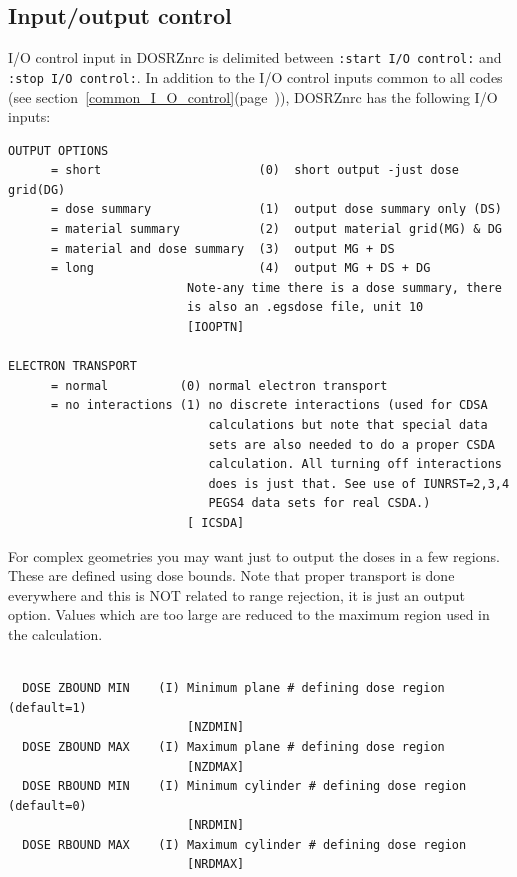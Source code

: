 \documentclass[12pt,twoside]{article}  %
\newcommand{\lpage}[1]{(page~\pageref{#1})}
\begin{document}
\subsection{Input/output control}

I/O control input in DOSRZnrc is delimited between \verb+:start I/O control:+
and\\ \verb+:stop I/O control:+.  In addition to the I/O control inputs
common to all codes (see
section~\ref{common_I_O_control}\lpage{common_I_O_control}),
DOSRZnrc has the following I/O inputs:

\begin{verbatim}
OUTPUT OPTIONS
      = short                      (0)  short output -just dose grid(DG)
      = dose summary               (1)  output dose summary only (DS)
      = material summary           (2)  output material grid(MG) & DG
      = material and dose summary  (3)  output MG + DS
      = long                       (4)  output MG + DS + DG
                         Note-any time there is a dose summary, there
                         is also an .egsdose file, unit 10
                         [IOOPTN]

ELECTRON TRANSPORT
      = normal          (0) normal electron transport 
      = no interactions (1) no discrete interactions (used for CDSA
                            calculations but note that special data
                            sets are also needed to do a proper CSDA
                            calculation. All turning off interactions 
                            does is just that. See use of IUNRST=2,3,4 
                            PEGS4 data sets for real CSDA.)
                         [ ICSDA]
\end{verbatim}
For complex geometries you may want just to output the doses in 
a few regions.  These are defined using dose bounds. Note that
proper transport is done everywhere and this is
NOT related to range rejection, it is just an output option.  Values which
are too large are reduced to the maximum region used in the calculation.

\begin{verbatim}

  DOSE ZBOUND MIN    (I) Minimum plane # defining dose region (default=1)
                         [NZDMIN]
  DOSE ZBOUND MAX    (I) Maximum plane # defining dose region
                         [NZDMAX]
  DOSE RBOUND MIN    (I) Minimum cylinder # defining dose region (default=0)
                         [NRDMIN]
  DOSE RBOUND MAX    (I) Maximum cylinder # defining dose region
                         [NRDMAX]
\end{verbatim}
\end{document}
